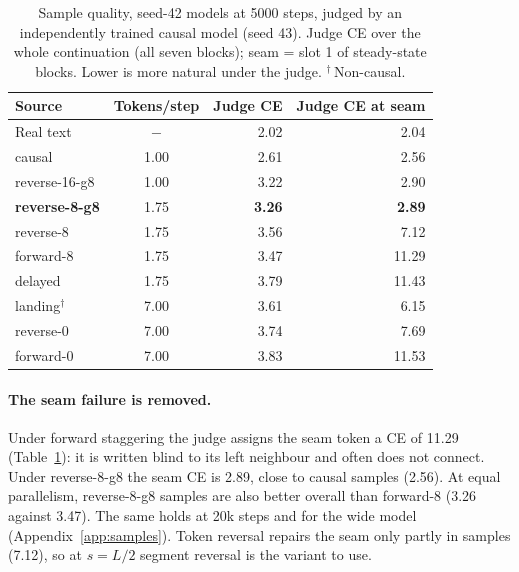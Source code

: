\documentclass[11pt]{article}
\theoremstyle{definition}
\theoremstyle{remark}
\newcommand{\sch}[1]{\textsf{#1}}
\begin{document}
\begin{table}[t]
  \centering
  \caption{Sample quality, seed-42 models at 5000 steps, judged by an independently trained causal model (seed 43). Judge CE over the whole continuation (all seven blocks); seam = slot 1 of steady-state blocks. Lower is more natural under the judge. $^\dagger$\,Non-causal.}
  \label{tab:samples}
  \small
  \begin{tabular}{lcrr}
    \toprule
    Source & Tokens/step & Judge CE & Judge CE at seam \\
    \midrule
    Real text            & $-$  & 2.02 & 2.04 \\
    \sch{causal}         & 1.00 & 2.61 & 2.56 \\
    \sch{reverse-16-g8}  & 1.00 & 3.22 & 2.90 \\
    \midrule
    \textbf{\sch{reverse-8-g8}} & 1.75 & \textbf{3.26} & \textbf{2.89} \\
    \sch{reverse-8}      & 1.75 & 3.56 & 7.12 \\
    \sch{forward-8}      & 1.75 & 3.47 & 11.29 \\
    \sch{delayed}        & 1.75 & 3.79 & 11.43 \\
    \midrule
    \sch{landing}$^\dagger$ & 7.00 & 3.61 & 6.15 \\
    \sch{reverse-0}      & 7.00 & 3.74 & 7.69 \\
    \sch{forward-0}      & 7.00 & 3.83 & 11.53 \\
    \bottomrule
  \end{tabular}
\end{table}

\paragraph{The seam failure is removed.}
Under forward staggering the judge assigns the seam token a CE of 11.29 (Table~\ref{tab:samples}): it is written blind to its left neighbour and often does not connect.
Under \sch{reverse-8-g8} the seam CE is 2.89, close to causal samples (2.56).
At equal parallelism, \sch{reverse-8-g8} samples are also better overall than \sch{forward-8} (3.26 against 3.47).
The same holds at 20k steps and for the wide model (Appendix~\ref{app:samples}).
Token reversal repairs the seam only partly in samples (7.12), so at $s=L/2$ segment reversal is the variant to use.
\end{document}

